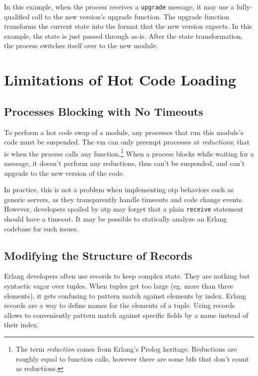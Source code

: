 In this example, when the process receives a \lstinline{upgrade} message, it may use a fully-qualified call to the new version's upgrade function. The upgrade function transforms the current state into the format that the new version expects. In this example, the state is just passed through as-is. After the state transformation, the process switches itself over to the new module.



\section{Limitations of Hot Code Loading}

\subsection{Processes Blocking with No Timeouts}

To perform a hot code swap of a module, any processes that run this module's code must be suspended. The \acrshort{vm} can only preempt processes at \emph{reductions}; that is when the process calls any function.\footnote{The term \emph{reduction} comes from Erlang's Prolog heritage. Reductions are roughly equal to function calls, however there are some \acrshort{bif}s that don't count as reductions.} When a process blocks while waiting for a message, it doesn't perform any reductions, thus can't be suspended, and can't upgrade to the new version of the code.

In practice, this is not a problem when implementing \acrshort{otp} behaviors such as generic servers, as they transparently handle timeouts and code change events. However, developers spoiled by \acrshort{otp} may forget that a plain \lstinline|receive| statement should have a timeout. It may be possible to statically analyze an Erlang codebase for such issues.

\subsection{Modifying the Structure of Records}

Erlang developers often use records to keep complex state. They are nothing but syntactic sugar over tuples. When tuples get too large (eg. more than three elements), it gets confusing to pattern match against elements by index. Erlang records are a way to define names for the elements of a tuple. Using records allows to conveniently pattern match against specific fields by a name instead of their index.

